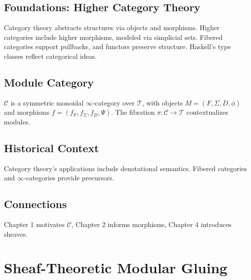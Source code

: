\documentclass[12pt]{article}
\begin{document}
\subsection{Foundations: Higher Category Theory}
Category theory abstracts structures via objects and morphisms. Higher categories \cite{lurie2009higher} include higher morphisms, modeled via simplicial sets. Fibered categories support pullbacks, and functors preserve structure. Haskell’s type classes reflect categorical ideas.

\subsection{Module Category}
$\mathcal{C}$ is a symmetric monoidal $\infty$-category over $\mathcal{T}$, with objects $M = (F, \Sigma, D, \phi)$ and morphisms $f = (f_F, f_\Sigma, f_D, \Psi)$. The fibration $\pi : \mathcal{C} \to \mathcal{T}$ contextualizes modules.

\subsection{Historical Context}
Category theory’s applications \cite{lawvere2009conceptual} include denotational semantics. Fibered categories and $\infty$-categories provide precursors.

\subsection{Connections}
Chapter 1 motivates $\mathcal{C}$, Chapter 2 informs morphisms, Chapter 4 introduces sheaves.

\begin{center}
\end{center}

\section{Sheaf-Theoretic Modular Gluing}
\label{sec:chapter4}
\end{document}
